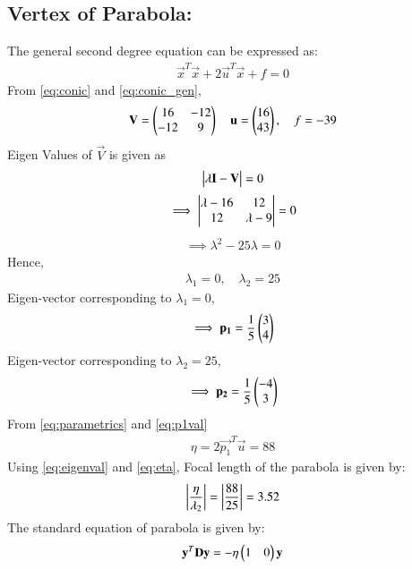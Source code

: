 \documentclass[journal,12pt,twocolumn]{IEEEtran}
\begin{document}
\subsection{Vertex of Parabola:}
The general second degree equation can be expressed as:
\begin{align}
\vec{x}^T\vec{x}+2\vec{u}^T\vec{x}+f=0 \label{eq:conic_gen}
\end{align}
From \eqref{eq:conic} and \eqref{eq:conic_gen},
\begin{align}
\mathbf{V}=\begin{pmatrix}16 & -12 \\ -12 & 9 \end{pmatrix} \quad\mathbf{u}=\begin{pmatrix}16 \\ 43\end{pmatrix},\quad f=-39 \label{eq:parametrics}
\end{align}
Eigen Values of $\vec{V}$ is given as
\begin{align}
\begin{vmatrix}\lambda \mathbf{I}-\mathbf{V}\end{vmatrix} = 0
\end{align}
\begin{align}
\implies \begin{vmatrix}\lambda-16 & 12 \\ 12 & \lambda-9\end{vmatrix} =0
\end{align}
\begin{align}
\implies \lambda^2-25\lambda=0 \label{eq:chartistic}
\end{align}
Hence, 
\begin{align}
 \lambda_1=0, \quad  \lambda_2=25 \label{eq:eigenval}
\end{align}
Eigen-vector corresponding to $\lambda_1=0$,
\begin{align}
\implies \mathbf{p_1} = \frac{1}{5} \begin{pmatrix}3 \\ 4\end{pmatrix} \label{eq:p1val}
\end{align}
Eigen-vector corresponding to $\lambda_2=25$,
\begin{align}
\implies \mathbf{p_2} = \frac{1}{5} \begin{pmatrix}-4\\ 3\end{pmatrix} \label{eq:p2val}
\end{align}
From \eqref{eq:parametrics} and \eqref{eq:p1val}
\begin{align}
 \eta = 2\vec{p_1}^T\vec{u}= 88 \label{eq:eta} 
\end{align}
Using \eqref{eq:eigenval} and \eqref{eq:eta}, Focal length of the parabola is given by:
\begin{align}
 \left\vert\frac{\eta}{\lambda_2}\right\vert = \left\vert\frac{88}{25}\right\vert = 3.52 \label{eq:fl} 
\end{align}
The standard equation of parabola is given by:
\begin{align}
 \mathbf{y}^T\mathbf{D}\mathbf{y} = -\eta \begin{pmatrix}1 & 0\end{pmatrix}\mathbf{y} \label{eq:parabola}
\end{align}
\end{document}
